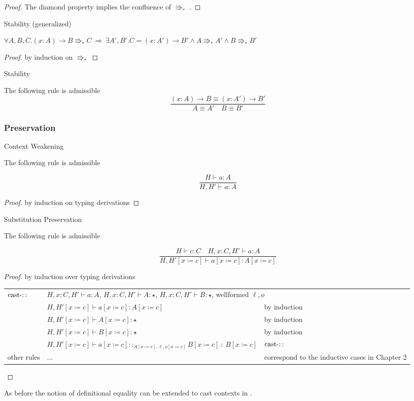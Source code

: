 \begin{proof}
The diamond property implies the confluence of $\Rrightarrow_{\ast}$
.
\end{proof}
\begin{lem}
Stability (generalized)

$\forall A,B,C.\left(x:A\right)\rightarrow B\Rrightarrow_{\ast}C\:\Rightarrow\:\exists A',B'.C=\left(x:A'\right)\rightarrow B'\land A\Rrightarrow_{\ast}A'\land B\Rrightarrow_{\ast}B'$
\end{lem}

\begin{proof}
by induction on $\Rrightarrow_{\ast}$
\end{proof}
\begin{cor}
Stability

The following rule is admissible
\[
\frac{\left(x:A\right)\rightarrow B\equiv\left(x:A'\right)\rightarrow B'}{A\equiv A'\quad B\equiv B'}
\]
\end{cor}


\subsubsection{Preservation}
\begin{lem}
Context Weakening

The following rule is admissible

\[
\frac{H\vdash a:A}{H,H'\vdash a:A}
\]
\end{lem}

\begin{proof}
by induction on typing derivations
\end{proof}
\begin{lem}
Substitution Preservation

The following rule is admissible

\[
\frac{H\vdash c:C\quad H,x:C,H'\vdash a:A}{H,H'\left[x\coloneqq c\right]\vdash a\left[x\coloneqq c\right]:A\left[x\coloneqq c\right]}
\]
\end{lem}

\begin{proof}
by induction over typing derivations

\begin{tabular}{lll}
$\operatorname{cast-::}$ & \multicolumn{2}{l}{$H,x:C,H'\vdash a:A$, $H,x:C,H'\vdash A:\star$, $H,x:C,H'\vdash B:\star$,
wellformed $\ensuremath{\ell},o$}\tabularnewline
 & $H,H'\left[x\coloneqq c\right]\vdash a\left[x\coloneqq c\right]:A\left[x\coloneqq c\right]$ & by induction\tabularnewline
 & $H,H'\left[x\coloneqq c\right]\vdash A\left[x\coloneqq c\right]:\star$ & by induction\tabularnewline
 & $H,H'\left[x\coloneqq c\right]\vdash B\left[x\coloneqq c\right]:\star$ & by induction\tabularnewline
 & $H,H'\left[x\coloneqq c\right]\vdash a\left[x\coloneqq c\right]::_{A\left[x\coloneqq c\right],\ensuremath{\ell},o\left[x\coloneqq c\right]}B\left[x\coloneqq c\right]\::\:B\left[x\coloneqq c\right]$ & $\operatorname{cast-::}$\tabularnewline
other rules & ... & correspond to the inductive cases in Chapter 2\tabularnewline
\end{tabular}
\end{proof}
As before the notion of definitional equality can be extended to cast contexts in .

